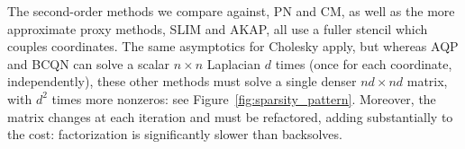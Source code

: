 The second-order methods we compare against, PN and CM, as well as the more approximate
proxy methods, SLIM and AKAP, all use a fuller stencil which couples coordinates.
The same asymptotics for Cholesky apply, but whereas AQP and BCQN can solve a scalar $n\times n$ Laplacian
$d$ times (once for each coordinate, independently), these other methods
must solve a single denser $nd\times nd$ matrix, with $d^2$ times more
nonzeros: see Figure~\ref{fig:sparsity_pattern}.
Moreover, the matrix changes at each iteration and must be refactored,
adding substantially to the cost: factorization is significantly slower
than backsolves.


